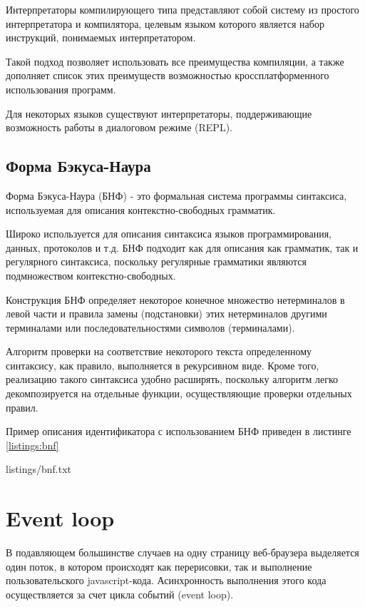 Интерпретаторы компилирующего типа представляют собой систему из простого интерпретатора и компилятора, целевым языком которого является набор инструкций, понимаемых интерпретатором.

Такой подход позволяет использовать все преимущества компиляции, а также дополняет список этих преимуществ возможностью кроссплатформенного использования программ.

Для некоторых языков существуют интерпретаторы, поддерживающие возможность работы в диалоговом режиме (REPL).


 
\subsection{Форма Бэкуса-Наура}

Форма Бэкуса-Наура (БНФ) - это формальная система программы синтаксиса, используемая для описания контекстно-свободных грамматик.

Широко используется для описания синтаксиса языков программирования, данных, протоколов и т.д. БНФ подходит как для описания как грамматик, так и регулярного синтаксиса, поскольку регулярные грамматики являются подмножеством контекстно-свободных.

Конструкция БНФ определяет некоторое конечное множество нетерминалов в левой части и правила замены (подстановки) этих нетерминалов другими терминалами или последовательностями символов (терминалами).

Алгоритм проверки на соответствие некоторого текста определенному синтаксису, как правило, выполняется в рекурсивном виде. Кроме того, реализацию такого синтаксиса удобно расширять, поскольку алгоритм легко декомпозируется на отдельные функции, осуществляющие проверки отдельных правил.

Пример описания идентификатора с использованием БНФ приведен в листинге \ref{listings:bnf}


{listings/bnf.txt}

\section{Event loop}
В подавляющем большинстве случаев на одну страницу веб-браузера выделяется один поток, в котором происходят как перерисовки, так и выполнение пользовательского javascript-кода. Асинхронность выполнения этого кода осуществляется за счет цикла событий (event loop).

